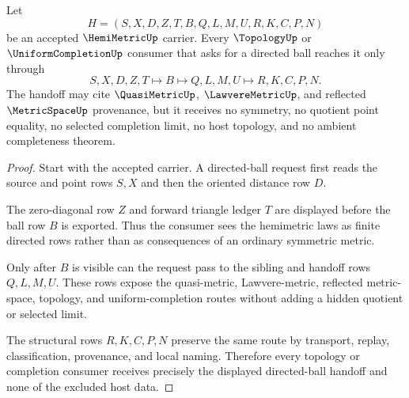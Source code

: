 \begin{theorem}
\label{thm:hemimetric-directed-ball-handoff}
Let
$$
H=(S,X,D,Z,T,B,Q,L,M,U,R,K,C,P,N)
$$
be an accepted $\HemiMetricUp$ carrier. Every $\TopologyUp$ or $\UniformCompletionUp$ consumer that asks for a directed ball reaches it only through
$$
S,X,D,Z,T \longmapsto B \longmapsto Q,L,M,U \longmapsto R,K,C,P,N .
$$
The handoff may cite $\QuasiMetricUp$, $\LawvereMetricUp$, and reflected $\MetricSpaceUp$ provenance, but it receives no symmetry, no quotient point equality, no selected completion limit, no host topology, and no ambient completeness theorem.
\end{theorem}
\begin{proof}
Start with the accepted carrier. A directed-ball request first reads the source and point rows $S,X$ and then the oriented distance row $D$.

The zero-diagonal row $Z$ and forward triangle ledger $T$ are displayed before the ball row $B$ is exported. Thus the consumer sees the hemimetric laws as finite directed rows rather than as consequences of an ordinary symmetric metric.

Only after $B$ is visible can the request pass to the sibling and handoff rows $Q,L,M,U$. These rows expose the quasi-metric, Lawvere-metric, reflected metric-space, topology, and uniform-completion routes without adding a hidden quotient or selected limit.

The structural rows $R,K,C,P,N$ preserve the same route by transport, replay, classification, provenance, and local naming. Therefore every topology or completion consumer receives precisely the displayed directed-ball handoff and none of the excluded host data.
\end{proof}

\begin{closurestatus}{\HemiMetricUp}
  \theoryclosure{\seedClosure}
  \formalstatus{\unformalizedV}
\end{closurestatus}
